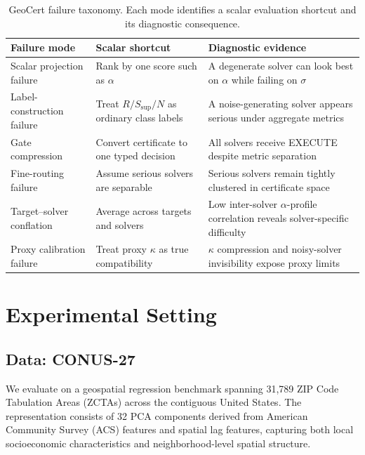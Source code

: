 \documentclass{article}
\begin{document}
\begin{table}[t]
\centering
\caption{GeoCert failure taxonomy. Each mode identifies a scalar evaluation shortcut and its diagnostic consequence.}
\label{tab:taxonomy}
\small
\begin{tabular}{@{}p{3.2cm}p{4.0cm}p{5.5cm}@{}}
\toprule
\textbf{Failure mode} & \textbf{Scalar shortcut} & \textbf{Diagnostic evidence} \\
\midrule
Scalar projection failure & Rank by one score such as $\alpha$ & A degenerate solver can look best on $\alpha$ while failing on $\sigma$ \\[4pt]
Label-construction failure & Treat $R/S_{\text{sup}}/N$ as ordinary class labels & A noise-generating solver appears serious under aggregate metrics \\[4pt]
Gate compression & Convert certificate to one typed decision & All solvers receive EXECUTE despite metric separation \\[4pt]
Fine-routing failure & Assume serious solvers are separable & Serious solvers remain tightly clustered in certificate space \\[4pt]
Target--solver conflation & Average across targets and solvers & Low inter-solver $\alpha$-profile correlation reveals solver-specific difficulty \\[4pt]
Proxy calibration failure & Treat proxy $\kappa$ as true compatibility & $\kappa$ compression and noisy-solver invisibility expose proxy limits \\
\bottomrule
\end{tabular}
\end{table}

\section{Experimental Setting}
\label{sec:setting}

\subsection{Data: CONUS-27}

We evaluate on a geospatial regression benchmark spanning 31{,}789 ZIP Code Tabulation Areas (ZCTAs) across the contiguous United States. The representation consists of 32 PCA components derived from American Community Survey (ACS) features and spatial lag features, capturing both local socioeconomic characteristics and neighborhood-level spatial structure.
\end{document}
